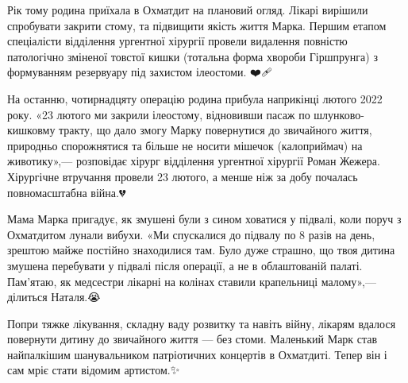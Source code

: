 Рік тому родина приїхала в Охматдит на плановий огляд. Лікарі вирішили
спробувати закрити стому, та підвищити якість життя Марка. Першим етапом
спеціалісти відділення ургентної хірургії провели видалення повністю
патологічно зміненої товстої кишки (тотальна форма хвороби Гіршпрунга) з
формуванням резервуару під захистом ілеостоми. ❤️🩹

На останню, чотирнадцяту операцію родина прибула наприкінці лютого 2022 року.
«23 лютого ми закрили ілеостому, відновивши пасаж по шлунково-кишковму тракту,
що дало змогу Марку повернутися до звичайного життя, природньо спорожнятися та
більше не носити мішечок (калоприймач) на животику»,— розповідає хірург
відділення ургентної хірургії Роман Жежера. Хірургічне втручання провели 23
лютого, а менше ніж за добу почалась повномасштабна війна.💔

Мама Марка пригадує, як змушені були з сином ховатися у підвалі, коли поруч з
Охматдитом лунали вибухи. «Ми спускалися до підвалу по 8 разів на день, зрештою
майже постійно знаходилися там. Було дуже страшно, що твоя дитина змушена
перебувати у підвалі після операції, а не в облаштованій палаті. Пам’ятаю, як
медсестри лікарні на колінах ставили крапельниці малому»,— ділиться Наталя.😭

Попри тяжке лікування, складну ваду розвитку та навіть війну, лікарям вдалося
повернути дитину до звичайного життя — без стоми. Маленький Марк став
найпалкішим шанувальником патріотичних концертів в Охматдиті. Тепер він і сам
мріє стати відомим артистом.✨


